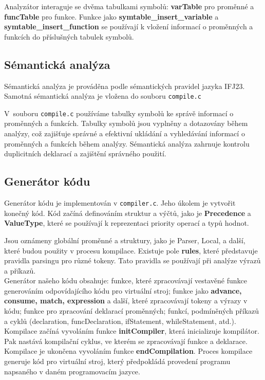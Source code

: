 \documentclass[a4paper, 11pt]{article}
\begin{document}
        Analyzátor interaguje se dvěma tabulkami symbolů: \textbf{varTable}  pro proměnné a \textbf{funcTable} pro funkce.
        Funkce jako \textbf{symtable\_insert\_variable} a \textbf{symtable\_insert\_function} se používají k vložení informací o proměnných a funkcích do příslušných tabulek symbolů.
        

	\subsection{Sémantická analýza}

	Sémantická analýza je prováděna podle sémantických pravidel jazyka IFJ23. Samotná sémantická analýza je vložena do souboru \verb|compile.c|

    V~souboru \verb|compile.c| používáme tabulky symbolů ke správě informací o proměnných a funkcích. Tabulky symbolů jsou vyplněny a dotazovány během analýzy, což zajišťuje správné a efektivní ukládání a vyhledávání informací o proměnných a funkcích během analýzy.
    Sémantická analýza zahrnuje kontrolu duplicitních deklarací a zajištění správného použití.



	\subsection{Generátor kódu}
 
        Generátor kódu je implementován v \texttt{compiler.c}. Jeho úkolem je vytvořit
        konečný kód. Kód začíná definováním struktur a výčtů, jako je \textbf{Precedence} a \textbf{ValueType}, které se používají k reprezentaci priority operací a typů hodnot.

        Jsou oznámeny globální proměnné a struktury, jako je Parser, Local, a další, které budou použity v procesu kompilace. Existuje pole \textbf{rules}, které představuje pravidla parsingu pro různé tokeny. Tato pravidla se používají při analýze výrazů a příkazů.\\
        Generátor našeho kódu obsahuje: funkce, které zpracovávají vestavěné funkce generováním odpovídajícího kódu pro virtuální stroj; funkce jako \textbf{advance, consume, match, expression} a další, které zpracovávají tokeny a výrazy v kódu; funkce pro zpracování deklarací proměnných; funkcí, podmíněných příkazů a cyklů (declaration, funcDeclaration, ifStatement, whileStatement, atd.).\\
        Kompilace začíná vyvoláním funkce \textbf{initCompiler}, která inicializuje kompilátor. Pak nastává kompilační cyklus, ve kterém se zpracovávají funkce a deklarace.
        Kompilace je ukončena vyvoláním funkce \textbf{endCompilation}.
        Proces kompilace generuje kód pro virtuální stroj, který předpokládá provedení programu napsaného v daném programovacím jazyce.\\
\end{document}
